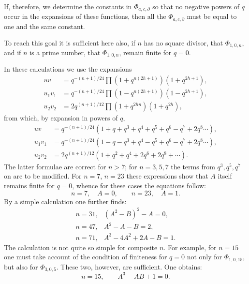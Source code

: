 \documentclass[11pt]{article}
\begin{document}
If, therefore, we determine the constants in $\Phi_{a,c,\partial}$ so that no negative powers of $q$ occur in the expansions of these functions, then all the $\Phi_{a,c,\partial}$ must be equal to one and the same constant.

To reach this goal it is sufficient here also, if $n$ has no square divisor, that $\Phi_{1,0,n}$, and if $n$ is a prime number, that $\Phi_{1,0,n}$, remain finite for $q=0$.

In these calculations we use the expansions
\begin{equation}
\begin{aligned}
uv&=q^{-(n+1)/24}\prod(1+q^{n(2h+1)})(1+q^{2h+1}),\\
u_1v_1&=q^{-(n+1)/24}\prod(1-q^{n(2h+1)})(1-q^{2h+1}),\\
u_2v_2&=2q^{(n+1)/12}\prod(1+q^{2hn})(1+q^{2h}),
\end{aligned}
\tag{6}
\end{equation}
from which, by expansion in powers of $q$,
\begin{equation}
\begin{aligned}
uv&=q^{-(n+1)/24}(1+q+q^3+q^4+q^5+q^6-q^7+2q^8\cdots),\\
u_1v_1&=q^{-(n+1)/24}(1-q-q^3+q^4-q^5+q^6-q^7+2q^8\cdots),\\
u_2v_2&=2q^{(n+1)/12}(1+q^2+q^4+2q^6+2q^8+\cdots).
\end{aligned}
\tag{7}
\end{equation}
The latter formulae are correct for $n>7$; for $n=3,5,7$ the terms from $q^3,q^5,q^7$ on are to be modified. For $n=7$, $n=23$ these expressions show that $A$ itself remains finite for $q=0$, whence for these cases the equations follow:
\begin{equation}
 n=7,\quad A=0,\qquad n=23,\quad A=1.
\tag{8}
\end{equation}
By a simple calculation one further finds:
\begin{equation}
\begin{array}{rl}
n=31,& (A^2-B)^2-A=0,\\
n=47,& A^2-A-B=2,\\
n=71,& A^3-4A^2+2A-B=1.
\end{array}
\tag{9}
\end{equation}
The calculation is not quite so simple for composite $n$. For example, for $n=15$ one must take account of the condition of finiteness for $q=0$ not only for $\Phi_{1,0,15}$, but also for $\Phi_{3,0,5}$. These two, however, are sufficient. One obtains:
\begin{equation}
 n=15,
 \qquad A^3-AB+1=0.
\tag{10}
\end{equation}
\end{document}
